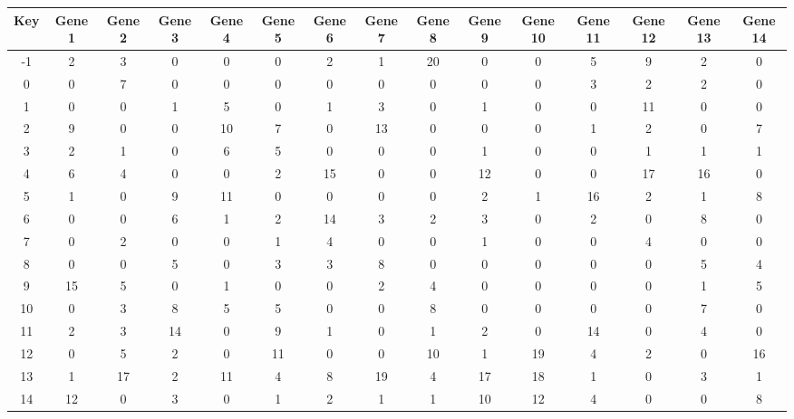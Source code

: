 \begin{tabular}{|c|c|c|c|c|c|c|c|c|c|c|c|c|c|c|}
\hline
Key & Gene 1 & Gene 2 & Gene 3 & Gene 4 & Gene 5 & Gene 6 & Gene 7 & Gene 8 & Gene 9 & Gene 10 & Gene 11 & Gene 12 & Gene 13 & Gene 14 \\
\hline
-1 & 2 & 3 & 0 & 0 & 0 & 2 & 1 & 20 & 0 & 0 & 5 & 9 & 2 & 0 \\
0 & 0 & 7 & 0 & 0 & 0 & 0 & 0 & 0 & 0 & 0 & 3 & 2 & 2 & 0 \\
1 & 0 & 0 & 1 & 5 & 0 & 1 & 3 & 0 & 1 & 0 & 0 & 11 & 0 & 0 \\
2 & 9 & 0 & 0 & 10 & 7 & 0 & 13 & 0 & 0 & 0 & 1 & 2 & 0 & 7 \\
3 & 2 & 1 & 0 & 6 & 5 & 0 & 0 & 0 & 1 & 0 & 0 & 1 & 1 & 1 \\
4 & 6 & 4 & 0 & 0 & 2 & 15 & 0 & 0 & 12 & 0 & 0 & 17 & 16 & 0 \\
5 & 1 & 0 & 9 & 11 & 0 & 0 & 0 & 0 & 2 & 1 & 16 & 2 & 1 & 8 \\
6 & 0 & 0 & 6 & 1 & 2 & 14 & 3 & 2 & 3 & 0 & 2 & 0 & 8 & 0 \\
7 & 0 & 2 & 0 & 0 & 1 & 4 & 0 & 0 & 1 & 0 & 0 & 4 & 0 & 0 \\
8 & 0 & 0 & 5 & 0 & 3 & 3 & 8 & 0 & 0 & 0 & 0 & 0 & 5 & 4 \\
9 & 15 & 5 & 0 & 1 & 0 & 0 & 2 & 4 & 0 & 0 & 0 & 0 & 1 & 5 \\
10 & 0 & 3 & 8 & 5 & 5 & 0 & 0 & 8 & 0 & 0 & 0 & 0 & 7 & 0 \\
11 & 2 & 3 & 14 & 0 & 9 & 1 & 0 & 1 & 2 & 0 & 14 & 0 & 4 & 0 \\
12 & 0 & 5 & 2 & 0 & 11 & 0 & 0 & 10 & 1 & 19 & 4 & 2 & 0 & 16 \\
13 & 1 & 17 & 2 & 11 & 4 & 8 & 19 & 4 & 17 & 18 & 1 & 0 & 3 & 1 \\
14 & 12 & 0 & 3 & 0 & 1 & 2 & 1 & 1 & 10 & 12 & 4 & 0 & 0 & 8 \\
\hline
\end{tabular}
